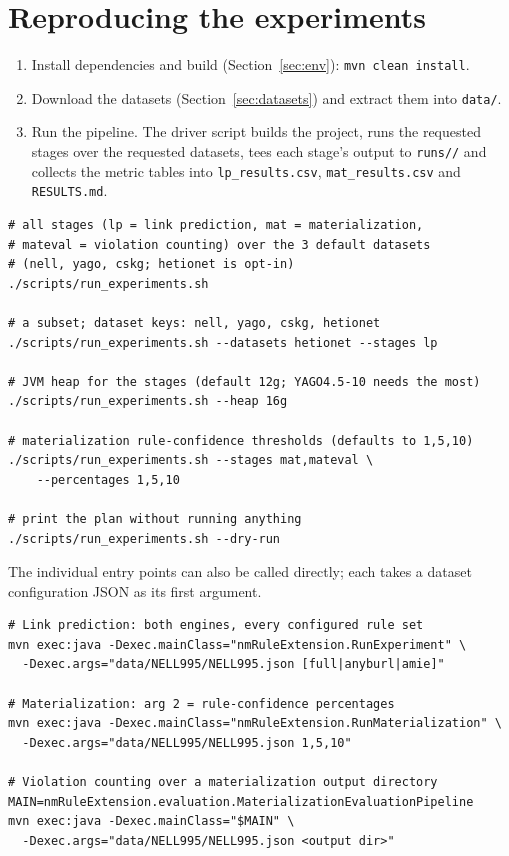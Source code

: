 \documentclass[runningheads]{llncs}
\begin{document}
\section{Reproducing the experiments}
\begin{enumerate}
    \item Install dependencies and build (Section~\ref{sec:env}): \texttt{mvn clean install}.
    \item Download the datasets (Section~\ref{sec:datasets}) and extract them into \texttt{data/}.
    \item Run the pipeline. The driver script builds the project, runs the requested stages over the
    requested datasets, tees each stage's output to \texttt{runs/\allowbreak [timestamp]/} and collects the
    metric tables into \texttt{lp\_results.csv}, \texttt{mat\_results.csv} and \texttt{RESULTS.md}.
\end{enumerate}

{\small
\begin{verbatim}
# all stages (lp = link prediction, mat = materialization,
# mateval = violation counting) over the 3 default datasets
# (nell, yago, cskg; hetionet is opt-in)
./scripts/run_experiments.sh

# a subset; dataset keys: nell, yago, cskg, hetionet
./scripts/run_experiments.sh --datasets hetionet --stages lp

# JVM heap for the stages (default 12g; YAGO4.5-10 needs the most)
./scripts/run_experiments.sh --heap 16g

# materialization rule-confidence thresholds (defaults to 1,5,10)
./scripts/run_experiments.sh --stages mat,mateval \
    --percentages 1,5,10

# print the plan without running anything
./scripts/run_experiments.sh --dry-run
\end{verbatim}
}

The individual entry points can also be called directly; each takes a dataset configuration JSON as
its first argument.

{\small
\begin{verbatim}
# Link prediction: both engines, every configured rule set
mvn exec:java -Dexec.mainClass="nmRuleExtension.RunExperiment" \
  -Dexec.args="data/NELL995/NELL995.json [full|anyburl|amie]"

# Materialization: arg 2 = rule-confidence percentages
mvn exec:java -Dexec.mainClass="nmRuleExtension.RunMaterialization" \
  -Dexec.args="data/NELL995/NELL995.json 1,5,10"

# Violation counting over a materialization output directory
MAIN=nmRuleExtension.evaluation.MaterializationEvaluationPipeline
mvn exec:java -Dexec.mainClass="$MAIN" \
  -Dexec.args="data/NELL995/NELL995.json <output dir>"
\end{verbatim}
}
\end{document}

